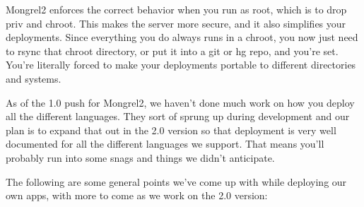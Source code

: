 Mongrel2 enforces the correct behavior when you run as root, which is to drop priv and
chroot.  This makes the server more secure, and it also simplifies your deployments.
Since everything you do always runs in a chroot, you now just need to rsync that chroot
directory, or put it into a git or hg repo, and you're set.  You're literally forced to
make your deployments portable to different directories and systems.

As of the 1.0 push for Mongrel2, we haven't done much work on how you deploy all
the different languages.  They sort of sprung up during development and our plan is
to expand that out in the 2.0 version so that deployment is very well documented
for all the different languages we support.  That means you'll probably run into
some snags and things we didn't anticipate.

The following are some general points we've come up with while deploying our
own apps, with more to come as we work on the 2.0 version:

